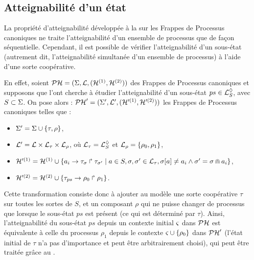 


\subsection{Atteignabilité d'un état}

\newcommand{\uastotal}{\tau}
\newcommand{\uasreach}{\rho}
\newcommand{\uasps}{{ps}}

La propriété d'atteignabilité développée à la 
sur les Frappes de Processus canoniques
ne traite l'atteignabilité d'un ensemble de processus que de façon séquentielle.
Cependant, il est possible de vérifier l'atteignabilité d'un sous-état
(autrement dit, l'atteignabilité simultanée d'un ensemble de processus)
à l'aide d'une sorte coopérative.

En effet, soient $\mathcal{PH} = (\Sigma, \mathcal{L}, (\mathcal{H}^{(1)}, \mathcal{H}^{(2)}))$ des Frappes de Processus
canoniques et supposons que l'ont cherche à étudier l'atteignabilité d'un sous-état
$\uasps \in \PHsubl_S$, avec $S \subset \Sigma$.
On pose alors : $\mathcal{PH}' = (\Sigma', \mathcal{L}', (\mathcal{H}'^{(1)}, \mathcal{H}'^{(2)}))$
les Frappes de Processus canoniques telles que :
\begin{itemize}
  \item $\PHs' = \PHs \cup \{ \uastotal, \uasreach \}$,
  \item $\PHl' = \PHl \times \PHl_\uastotal \times \PHl_\uasreach$, où
    $\PHl_\uastotal = \PHsubl_S$ et $\PHl_\uasreach = \{ \uasreach_0, \uasreach_1 \}$,
  \item $\PHh'^{(1)} = \PHh^{(1)} \cup
      \{ \PHfrappe{a_i}{\uastotal_\mysigma}{\uastotal_{\mysigma'}} \mid
      a \in S, \mysigma, \mysigma' \in \PHl_\uastotal,
      \PHget{\mysigma}{a} \neq a_i \wedge \mysigma' = \mysigma \recouvre a_i \}$,
  \item $\PHh'^{(2)} = \PHh^{(2)} \cup \{ \PHfrappe{\uastotal_\uasps}{\uasreach_0}{\uasreach_1} \}$.
\end{itemize}
Cette transformation consiste donc à ajouter au modèle
une sorte coopérative $\uastotal$ sur toutes les sortes de $S$,
et un composant $\uasreach$ qui ne puisse changer de processus que lorsque le sous-état $\uasps$
est présent (ce qui est déterminé par $\uastotal$).
Ainsi, l'atteignabilité du sous-état $\uasps$ depuis un contexte initial $\varsigma$ dans $\mathcal{PH}$
est équivalente à celle du processus $\uasreach_1$ depuis le contexte
$\ctx \cup \{ \uasreach_0 \}$ dans $\mathcal{PH}'$
(l'état initial de $\uastotal$ n'a pas d'importance et peut être arbitrairement choisi),
qui peut être traitée grâce au .

